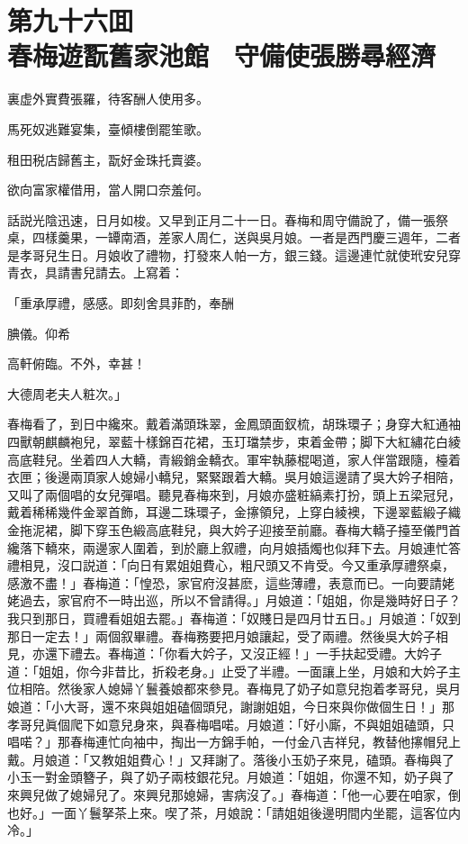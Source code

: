 
\chapter*{第九十六囬　\\春梅遊翫舊家池館　守備使張勝尋經濟}


\begin{myquote}
裏虚外實費張羅，待客酬人使用多。

馬死奴逃難宴集，臺傾樓倒罷笙歌。

租田税店歸舊主，翫好金珠托賣婆。

欲向富家權借用，當人開口奈羞何。
\end{myquote}

話説光陰迅速，日月如梭。又早到正月二十一日。春梅和周守備說了，備一張祭桌，四樣羹果，一罈南酒，差家人周仁，送與吳月娘。一者是西門慶三週年，二者是孝哥兒生日。月娘收了禮物，打發來人帕一方，銀三錢。這邊連忙就使玳安兒穿青衣，具請書兒請去。上寫着：

\begin{myquote}[\markfont]
「重承厚禮，感感。即刻舍具菲酌，奉酬

腆儀。仰希

高軒俯臨。不外，幸甚！


\raggedright{大德周老夫人粧次。」}
\end{myquote}

春梅看了，到日中纔來。戴着滿頭珠翠，金鳳頭面釵梳，胡珠環子；身穿大紅通袖四獸朝麒麟袍兒，翠藍十樣錦百花裙，玉玎璫禁步，束着金帶；脚下大紅繡花白綾高底鞋兒。坐着四人大轎，青緞銷金轎衣。軍牢執藤棍喝道，家人伴當跟隨，檯着衣匣；後邊兩頂家人媳婦小轎兒，緊緊跟着大轎。吳月娘這邊請了吳大妗子相陪，又叫了兩個唱的女兒彈唱。聽見春梅來到，月娘亦盛粧縞素打扮，頭上五梁冠兒，戴着稀稀幾件金翠首飾，耳邊二珠環子，金㩟領兒，上穿白綾襖，下邊翠藍緞子織金拖泥裙，脚下穿玉色緞高底鞋兒，與大妗子迎接至前廳。春梅大轎子擡至儀門首纔落下轎來，兩邊家人圍着，到於廳上叙禮，向月娘插燭也似拜下去。月娘連忙答禮相見，沒口説道：「向日有累姐姐費心，粗尺頭又不肯受。今又重承厚禮祭桌，感激不盡！」春梅道：「惶恐，家官府沒甚麽，這些薄禮，表意而已。一向要請姥姥過去，家官府不一時出巡，所以不曾請得。」月娘道：「姐姐，你是幾時好日子？我只到那日，買禮看姐姐去罷。」春梅道：「奴賤日是四月廿五日。」月娘道：「奴到那日一定去！」兩個叙畢禮。春梅務要把月娘讓起，受了兩禮。然後吳大妗子相見，亦還下禮去。春梅道：「你看大妗子，又沒正經！」一手扶起受禮。大妗子道：「姐姐，你今非昔比，折殺老身。」止受了半禮。一面讓上坐，月娘和大妗子主位相陪。然後家人媳婦丫鬟養娘都來參見。春梅見了奶子如意兒抱着孝哥兒，吳月娘道：「小大哥，還不來與姐姐磕個頭兒，謝謝姐姐，今日來與你做個生日！」那孝哥兒眞個爬下如意兒身來，與春梅唱喏。月娘道：「好小廝，不與姐姐磕頭，只唱喏？」那春梅連忙向袖中，掏出一方錦手帕，一付金八吉祥兒，教替他㩟帽兒上戴。月娘道：「又教姐姐費心！」又拜謝了。落後小玉奶子來見，磕頭。春梅與了小玉一對金頭簪子，與了奶子兩枝銀花兒。月娘道：「姐姐，你還不知，奶子與了來興兒做了媳婦兒了。來興兒那媳婦，害病沒了。」春梅道：「他一心要在咱家，倒也好。」一面丫鬟拏茶上來。喫了茶，月娘說：「請姐姐後邊明間内坐罷，這客位内冷。」

